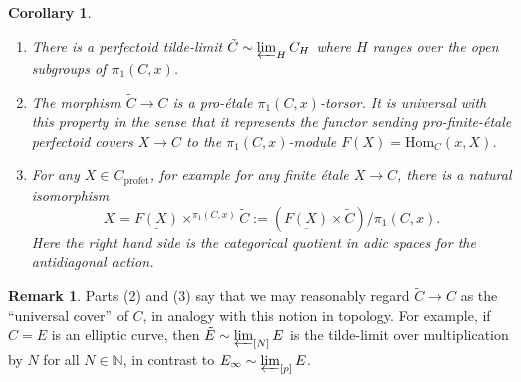\documentclass[10pt,oneside]{amsart}
\newtheorem{corollary}[theorem]{Corollary}
\theoremstyle{definition}
\newtheorem{remark}[theorem]{Remark}
\newcommand{\N}{\mathbb{N}}
\begin{document}
	\begin{corollary}\label{c:universal-covers-of-curves}
		\begin{enumerate}
		\item There is a perfectoid tilde-limit $\tilde{C} \sim \varprojlim_{H}C_H$ where $H$ ranges over the open subgroups of $ \pi_1(C,x)$. 
		\item The morphism $\tilde{C}\to C$ is a pro-\'etale $\pi_1(C,x)$-torsor. It is universal with this property in the sense that it represents the functor sending	 pro-finite-\'etale perfectoid covers $X\to C$ to the $\pi_1(C,x)$-module $F(X)=\mathrm{Hom}_C(x,X)$.
		\item For any $X\in C_{\mathrm{prof\acute{e}t}}$, for example for any finite \'etale $X\to C$, there is a natural isomorphism
		\[ X = \underline{F(X)}\times^{\pi_1(C,x)}\tilde{C}:=(\underline{F(X)}\times \tilde{C})/\pi_1(C,x).\]
		Here the right hand side is the categorical quotient in adic spaces for the antidiagonal action.
	\end{enumerate}
	\end{corollary}
\begin{remark}
Parts (2) and (3) say that we may reasonably regard $\tilde{C}\to C$ as the ``universal cover'' of $C$, in analogy with this notion in topology.
For example, if $C=E$ is an elliptic curve, then $\tilde{E}\sim\varprojlim_{[N]}E$ is the tilde-limit over multiplication by $N$ for all $N\in \N$, in contrast to $E_\infty\sim \varprojlim_{[p]} E$.
\end{remark}
\end{document}

